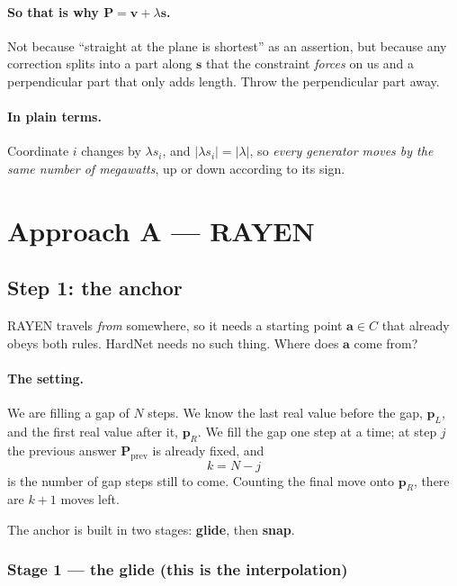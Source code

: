 \documentclass[11pt]{article}
\begin{document}
\paragraph{So that is why $\mathbf{P}=\mathbf{v}+\lambda\mathbf{s}$.} Not because
``straight at the plane is shortest'' as an assertion, but because any correction
splits into a part along $\mathbf{s}$ that the constraint \emph{forces} on us and
a perpendicular part that only adds length. Throw the perpendicular part away.

\paragraph{In plain terms.} Coordinate $i$ changes by $\lambda s_i$, and
$|\lambda s_i| = |\lambda|$, so \emph{every generator moves by the same number of
megawatts}, up or down according to its sign.

\section{Approach A --- RAYEN}

\subsection*{Step 1: the anchor}

RAYEN travels \emph{from} somewhere, so it needs a starting point $\mathbf{a}\in C$
that already obeys both rules. HardNet needs no such thing. Where does
$\mathbf{a}$ come from?

\paragraph{The setting.} We are filling a gap of $N$ steps. We know the last real
value before the gap, $\mathbf{p}_L$, and the first real value after it,
$\mathbf{p}_R$. We fill the gap one step at a time; at step $j$ the previous
answer $\mathbf{P}_{\text{prev}}$ is already fixed, and
\[
k = N - j
\]
is the number of gap steps still to come. Counting the final move onto
$\mathbf{p}_R$, there are $k+1$ moves left.

The anchor is built in two stages: \textbf{glide}, then \textbf{snap}.

\subsubsection*{Stage 1 --- the glide (this is the interpolation)}
\end{document}
